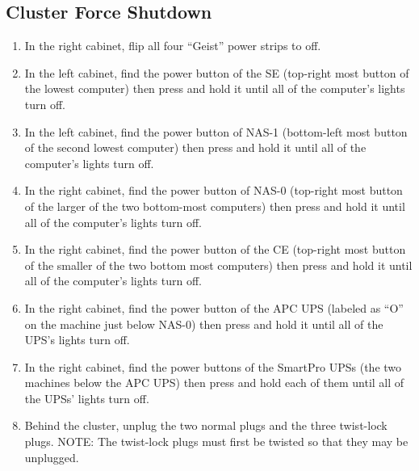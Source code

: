 \documentclass{article}
\begin{document}
  \subsection*{Cluster Force Shutdown}
  \begin{enumerate}
  \item
    In the right cabinet, flip all four ``Geist'' power strips to off.
  \item
    In the left cabinet, find the power button of the SE (top-right most
    button of the lowest computer) then press and hold it until all of the computer's
    lights turn off.
  \item
    In the left cabinet, find the power button of NAS-1 (bottom-left most
    button of the second lowest computer) then press and hold it until all of the
    computer's lights turn off.
  \item
    In the right cabinet, find the power button of NAS-0 (top-right
    most button of the larger of the two bottom-most computers) then press
    and hold it until all of the computer's lights turn off.
  \item
    In the right cabinet, find the power button of the CE (top-right
    most button of the smaller of the two bottom most computers) then press
    and hold it until all of the computer's lights turn off.
  \item
    In the right cabinet, find the power button of the APC UPS (labeled as ``O''
    on the machine just below NAS-0) then press and hold it until all of the
    UPS's lights turn off.
  \item
    In the right cabinet, find the power buttons of the SmartPro UPSs (the
    two machines below the APC UPS) then press and hold each of them until
    all of the UPSs' lights turn off.
  \item
    Behind the cluster, unplug the two normal plugs and the three twist-lock
    plugs. NOTE: The twist-lock plugs must first be twisted so that they may
    be unplugged.
  \end{enumerate}

\end{document}
